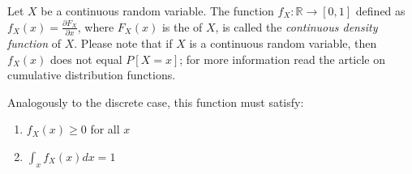 \documentclass{article}
\begin{document}

Let $X$ be a continuous random variable. The function $f_X\colon\mathbb{R} \to [0,1]$ defined as $ f_X(x) = \frac{\partial F_X}{\partial x} $, where $ F_X(x)$ is the  of $X$, is called the \emph{continuous density function} of $X$.
Please note that if $X$ is a continuous random variable, then $f_X(x)$ does not equal $P[X=x]$; for more information read the article on cumulative distribution functions.

Analogously to the discrete case, this function must satisfy:

\begin{enumerate}
\item $f_X(x) \geq 0$ for all $x$
\item $\int_{x}^{} {f_X(x) dx} = 1$
\end{enumerate}
\end{document}

